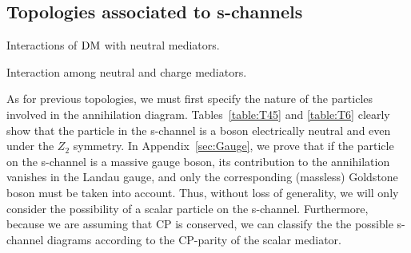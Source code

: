 \subsection{Topologies associated to s-channels }
\label{sec:schannels}

\begin{table}[H]
\begin{centering}
\begin{minipage}{0.44\textwidth}
\usebox{\schLagrangian}
\caption{Interactions of $\text{DM}$ with neutral mediators.}
\label{table:schLagrangian}
\end{minipage}
\hspace{40pt}
\begin{minipage}{0.44\textwidth}
\usebox{\Aform}
\caption{Interaction among neutral and charge mediators.}
\label{table:Acal}
\end{minipage}
\end{centering}
\end{table}

As for previous topologies, we must first specify the nature of the particles involved in the annihilation diagram. Tables~\ref{table:T45} and \ref{table:T6} clearly show that the particle in the s-channel is a boson  electrically neutral and even under the $Z_2$ symmetry. 
In Appendix~\ref{sec:Gauge}, we prove that if the particle on the s-channel is a massive gauge boson, its contribution to the annihilation vanishes in the Landau gauge, and only the corresponding  (massless) Goldstone boson must be taken into account. Thus, without loss of generality, we will only consider the possibility of a scalar particle on the s-channel. Furthermore, because we are assuming that CP is conserved, we can classify the the possible s-channel diagrams according to the CP-parity of the scalar mediator.

